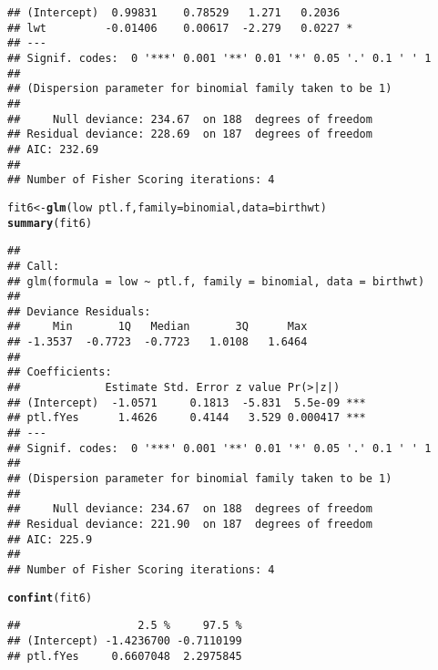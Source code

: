 \documentclass{article}\usepackage[]{graphicx}\usepackage[]{color}
\makeatletter
\newcommand{\hlopt}[1]{\textcolor[rgb]{0,0,0}{#1}}%
\newcommand{\hlstd}[1]{\textcolor[rgb]{0.345,0.345,0.345}{#1}}%
\newcommand{\hlkwb}[1]{\textcolor[rgb]{0.69,0.353,0.396}{#1}}%
\newcommand{\hlkwc}[1]{\textcolor[rgb]{0.333,0.667,0.333}{#1}}%
\newcommand{\hlkwd}[1]{\textcolor[rgb]{0.737,0.353,0.396}{\textbf{#1}}}%
\newenvironment{kframe}{%
 \def\at@end@of@kframe{}%
 \ifinner\ifhmode%
  \def\at@end@of@kframe{\end{minipage}}%
  \begin{minipage}{\columnwidth}%
 \fi\fi%
 \def\FrameCommand##1{\hskip\@totalleftmargin \hskip-\fboxsep
 \colorbox{shadecolor}{##1}\hskip-\fboxsep
     \hskip-\linewidth \hskip-\@totalleftmargin \hskip\columnwidth}%
 \MakeFramed {\advance\hsize-\width
   \@totalleftmargin\z@ \linewidth\hsize
   \@setminipage}}%
 {\par\unskip\endMakeFramed%
 \at@end@of@kframe}
\newenvironment{knitrout}{}{} %
\makeatother
\begin{document}
\begin{knitrout}
\begin{kframe}
\begin{verbatim}
## (Intercept)  0.99831    0.78529   1.271   0.2036  
## lwt         -0.01406    0.00617  -2.279   0.0227 *
## ---
## Signif. codes:  0 '***' 0.001 '**' 0.01 '*' 0.05 '.' 0.1 ' ' 1
## 
## (Dispersion parameter for binomial family taken to be 1)
## 
##     Null deviance: 234.67  on 188  degrees of freedom
## Residual deviance: 228.69  on 187  degrees of freedom
## AIC: 232.69
## 
## Number of Fisher Scoring iterations: 4
\end{verbatim}
\begin{alltt}
\hlstd{fit6} \hlkwb{<-} \hlkwd{glm}\hlstd{(low} \hlopt{~} \hlstd{ptl.f,} \hlkwc{family} \hlstd{= binomial,} \hlkwc{data} \hlstd{= birthwt)}
\hlkwd{summary}\hlstd{(fit6)}
\end{alltt}
\begin{verbatim}
## 
## Call:
## glm(formula = low ~ ptl.f, family = binomial, data = birthwt)
## 
## Deviance Residuals: 
##     Min       1Q   Median       3Q      Max  
## -1.3537  -0.7723  -0.7723   1.0108   1.6464  
## 
## Coefficients:
##             Estimate Std. Error z value Pr(>|z|)    
## (Intercept)  -1.0571     0.1813  -5.831  5.5e-09 ***
## ptl.fYes      1.4626     0.4144   3.529 0.000417 ***
## ---
## Signif. codes:  0 '***' 0.001 '**' 0.01 '*' 0.05 '.' 0.1 ' ' 1
## 
## (Dispersion parameter for binomial family taken to be 1)
## 
##     Null deviance: 234.67  on 188  degrees of freedom
## Residual deviance: 221.90  on 187  degrees of freedom
## AIC: 225.9
## 
## Number of Fisher Scoring iterations: 4
\end{verbatim}
\begin{alltt}
\hlkwd{confint}\hlstd{(fit6)}
\end{alltt}


{\ttfamily\noindent\itshape\color{messagecolor}{\#\# Waiting for profiling to be done...}}\begin{verbatim}
##                  2.5 %     97.5 %
## (Intercept) -1.4236700 -0.7110199
## ptl.fYes     0.6607048  2.2975845
\end{verbatim}
\end{kframe}
\end{knitrout}
\end{document}
